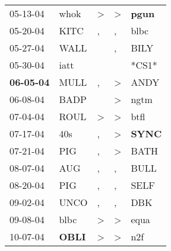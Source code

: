 \begin{supertabular}{p{0.07\textwidth}p{0.06\textwidth}p{0.02\textwidth}p{0.02\textwidth}p{0.06\textwidth}}
          05-13-04\textsuperscript{} &           whok\textsuperscript{} &     \textgreater &     \textgreater &  \textbf{pgun\textsuperscript{}} \\
          05-20-04\textsuperscript{} &           KITC\textsuperscript{} &                , &                , &           blbc\textsuperscript{} \\
          05-27-04\textsuperscript{} &           WALL\textsuperscript{} &                  &                , &           BILY\textsuperscript{} \\
          05-30-04\textsuperscript{} &           iatt\textsuperscript{} &                  &                  &                            *CS1* \\
 \textbf{06-05-04\textsuperscript{}} &           MULL\textsuperscript{} &                , &     \textgreater &           ANDY\textsuperscript{} \\
          06-08-04\textsuperscript{} &           BADP\textsuperscript{} &                  &     \textgreater &           ngtm\textsuperscript{} \\
          07-04-04\textsuperscript{} &           ROUL\textsuperscript{} &     \textgreater &     \textgreater &           btfl\textsuperscript{} \\
          07-17-04\textsuperscript{} &            40s\textsuperscript{} &                , &     \textgreater &  \textbf{SYNC\textsuperscript{}} \\
          07-21-04\textsuperscript{} &            PIG\textsuperscript{} &                , &     \textgreater &           BATH\textsuperscript{} \\
          08-07-04\textsuperscript{} &            AUG\textsuperscript{} &                , &                , &           BULL\textsuperscript{} \\
          08-20-04\textsuperscript{} &            PIG\textsuperscript{} &                , &                , &           SELF\textsuperscript{} \\
          09-02-04\textsuperscript{} &           UNCO\textsuperscript{} &                , &                , &            DBK\textsuperscript{} \\
          09-08-04\textsuperscript{} &           blbc\textsuperscript{} &     \textgreater &     \textgreater &           equa\textsuperscript{} \\
          10-07-04\textsuperscript{} &  \textbf{OBLI\textsuperscript{}} &     \textgreater &     \textgreater &            n2f\textsuperscript{} \\

\end{supertabular}
